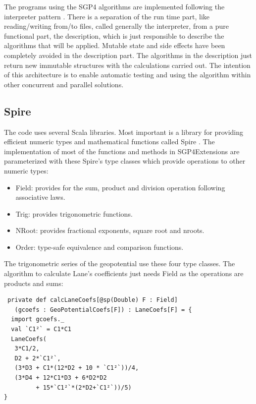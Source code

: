 \documentclass{article}
\begin{document}
The programs using the SGP4 algorithms are implemented following the interpreter pattern \cite[p. ~243]{GoF}.
There is a separation of the run time part, like reading/writing from/to files, called
generally the interpreter, from a pure functional part, the description, which is just
responsible to describe the algorithms that will be applied.
Mutable state and side effects have been completely avoided in the description part.
The algorithms in the description just return new immutable structures
with the calculations carried out. The intention of this architecture is to enable
automatic testing and using the algorithm within other concurrent and parallel solutions.


\subsection{Spire}
\label{sec:spire}

The code uses several Scala libraries. Most important is a library for providing efficient numeric types
and mathematical functions called Spire \cite{Spire2011}. The implementation of most of the functions and methods in SGP4Extensions
are parameterized with these Spire's type classes which provide operations to other numeric types:
\begin{itemize}
  \item  Field: provides for the sum, product and division operation following associative laws.
  \item  Trig: provides trigonometric functions.
  \item  NRoot: provides fractional exponents, square root and nroots.
  \item  Order: type-safe equivalence and comparison functions.
\end{itemize}
The trigonometric series of the geopotential use these four type classes.
The algorithm to calculate Lane's coefficients just needs Field as
the operations are products and sums:
\begin{verbatim}
 private def calcLaneCoefs[@sp(Double) F : Field]
   (gcoefs : GeoPotentialCoefs[F]) : LaneCoefs[F] = {
  import gcoefs._
  val `C1²` = C1*C1
  LaneCoefs(
   3*C1/2,
   D2 + 2*`C1²`,
   (3*D3 + C1*(12*D2 + 10 * `C1²`))/4,
   (3*D4 + 12*C1*D3 + 6*D2*D2
         + 15*`C1²`*(2*D2+`C1²`))/5)
}
\end{verbatim}
\end{document}
